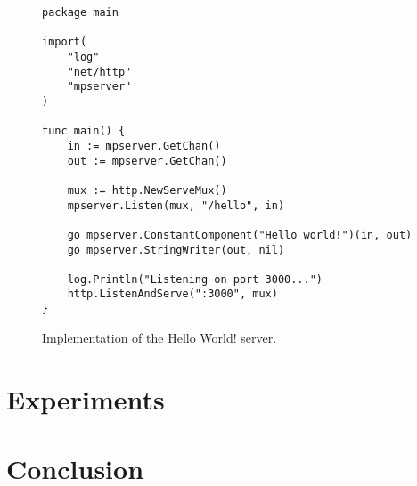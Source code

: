 \documentclass[12pt,a4paper]{article}
\begin{document}
\begin{figure}[h]
\centering
\begin{lstlisting}
package main

import(
    "log"
    "net/http"
    "mpserver"
)

func main() {
    in := mpserver.GetChan()
    out := mpserver.GetChan()

    mux := http.NewServeMux()
    mpserver.Listen(mux, "/hello", in)

    go mpserver.ConstantComponent("Hello world!")(in, out)
    go mpserver.StringWriter(out, nil)
    
    log.Println("Listening on port 3000...")
    http.ListenAndServe(":3000", mux)
}
\end{lstlisting}
\caption[scale=1.0]{Implementation of the Hello World! server.}
\label{fig:HelloWorldImpl}
\end{figure}

\newpage
\section{Experiments}
\section{Conclusion}
\end{document}
